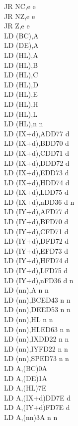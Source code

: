 \documentclass[twoside,openright,a4paper]{book}
\begin{document}
\begin{multicols}{3}
{\begin{tabbing}
	JR NC,e e\\
	JR NZ,e e\\
	JR Z,e e\\
	LD (BC),A\\
	LD (DE),A\\
	LD (HL),A\\
	LD (HL),B\\
	LD (HL),C\\
	LD (HL),D\\
	LD (HL),E\\
	LD (HL),H\\
	LD (HL),L\\
	LD (HL),n n\\
	LD (IX+d),A\>DD77 d\\
	LD (IX+d),B\>DD70 d\\
	LD (IX+d),C\>DD71 d\\
	LD (IX+d),D\>DD72 d\\
	LD (IX+d),E\>DD73 d\\
	LD (IX+d),H\>DD74 d\\
	LD (IX+d),L\>DD75 d\\
	LD (IX+d),n\>DD36 d n\\
	LD (IY+d),A\>FD77 d\\
	LD (IY+d),B\>FD70 d\\
	LD (IY+d),C\>FD71 d\\
	LD (IY+d),D\>FD72 d\\
	LD (IY+d),E\>FD73 d\\
	LD (IY+d),H\>FD74 d\\
	LD (IY+d),L\>FD75 d\\
	LD (IY+d),n\>FD36 d n\\
	LD (nn),A n n\\
	LD (nn),BC\>ED43 n n\\
	LD (nn),DE\>ED53 n n\\
	LD (nn),HL n n\\
	LD (nn),HL\>ED63 n n\\
	LD (nn),IX\>DD22 n n\\
	LD (nn),IY\>FD22 n n\\
	LD (nn),SP\>ED73 n n\\
	LD A,(BC)\>0A\\
	LD A,(DE)\>1A\\
	LD A,(HL)\>7E\\
	LD A,(IX+d)\>DD7E d\\
	LD A,(IY+d)\>FD7E d\\
	LD A,(nn)\>3A n n\\

\end{tabbing}}
\end{multicols}
\end{document}
